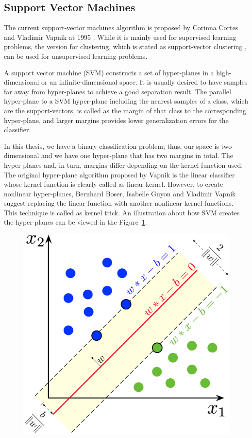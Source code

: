 \subsection{Support Vector Machines}

The current support-vector machines algorithm is proposed by Corinna Cortes and Vladimir Vapnik at 1995 \cite{svm_original}. While it is mainly used for supervised learning problems, the version for clustering, which is stated as support-vector clustering \cite{support_vector_clustering}, can be used for unsupervised learning problems.

A support vector machine (SVM) constructs a set of hyper-planes in a high-dimensional or an infinite-dimensional space. It is usually desired to have samples far away from hyper-planes to achieve a good separation result. The parallel hyper-plane to a SVM hyper-plane including the nearest samples of a class, which are the support-vectors, is called as the margin of that class to the corresponding hyper-plane, and larger margins provides lower generalization errors for the classifier. 

In this thesis, we have a binary classification problem; thus, our space is two-dimensional and we have one hyper-plane that has two margins in total. The hyper-planes and, in turn, margins differ depending on the kernel function used. The original hyper-plane algorithm proposed by Vapnik \cite{svm_original} is the linear classifier whose kernel function is clearly called as linear kernel. However, to create nonlinear hyper-planes, Bernhard Boser, Isabelle Guyon  and Vladimir Vapnik \cite{svm_kernel} suggest replacing the linear function with another nonlinear kernel functions. This technique is called as kernel trick. An illustration about how SVM creates the hyper-planes can be viewed in the Figure~\ref{fig:simple_svm}.

\begin{figure}[h]
	\centering
	\includegraphics[width=.4\linewidth]{fig/SVM_margin_binary.png}
	\vspace*{2mm}
	\label{fig:simple_svm}
\end{figure}

